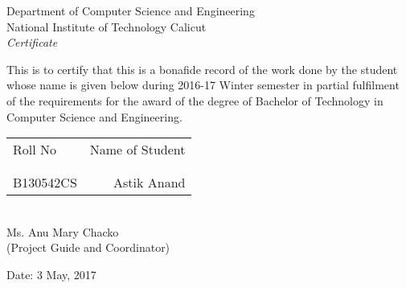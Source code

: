 \newpage
\thispagestyle{empty}

\begin{center}

\Large{Department of Computer Science and Engineering}\\[0.5cm]

\Large{National Institute of Technology Calicut}\\[2.0cm]

\emph{\LARGE Certificate}\\[2.5cm]
\end{center}
\normalsize This is to certify that this is a bonafide record of the work done by the student whose name is given below during 2016-17 Winter semester in partial fulfilment of the requirements for the award of the degree of Bachelor of Technology in Computer Science and Engineering.\\[1.0cm]

\begin{table}[h]
\centering
\begin{tabular}{lr}
Roll No & Name of Student \\ \\ \hline
\\
B130542CS & Astik Anand \\ 
\end{tabular}
\end{table}

\vfill


\begin{flushright}
\\
Ms. Anu Mary Chacko\\
(Project Guide and Coordinator)\\[1.5cm]
\end{flushright}

\begin{flushleft}
Date: 3 May, 2017
\end{flushleft}
